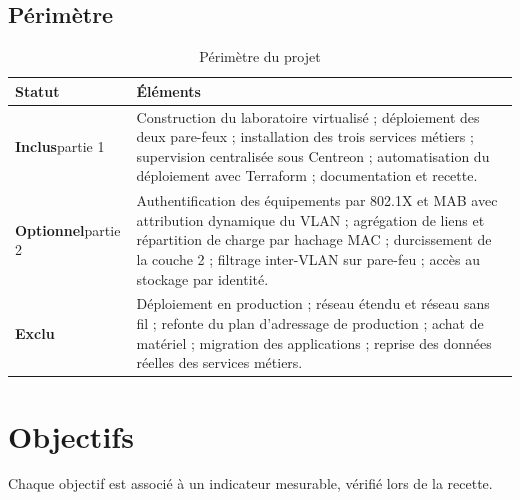 \documentclass[11pt,a4paper]{article}
\begin{document}
\subsection{Périmètre}\label{sec:perimetre}
\begin{table}[H]
\centering
\caption{Périmètre du projet}
\begin{tabularx}{\textwidth}{L{2.4cm} Y}
\toprule
{}\textbf{Statut} & \textbf{Éléments} \\
\midrule
\textbf{\color{okgreen}Inclus}\newline\footnotesize partie 1 & Construction du laboratoire virtualisé ; déploiement des deux pare-feux ; installation des trois services métiers ; supervision centralisée sous Centreon ; automatisation du déploiement avec Terraform ; documentation et recette. \\
\midrule
\textbf{\color{warn}Optionnel}\newline\footnotesize partie 2 & Authentification des équipements par 802.1X et MAB avec attribution dynamique du VLAN ; agrégation de liens et répartition de charge par hachage MAC ; durcissement de la couche 2 ; filtrage inter-VLAN sur pare-feu ; accès au stockage par identité. \\
\midrule
\textbf{Exclu} & Déploiement en production ; réseau étendu et réseau sans fil ; refonte du plan d'adressage de production ; achat de matériel ; migration des applications ; reprise des données réelles des services métiers. \\
\bottomrule
\end{tabularx}
\end{table}

\section{Objectifs}
Chaque objectif est associé à un indicateur mesurable, vérifié lors de la recette.
\end{document}
